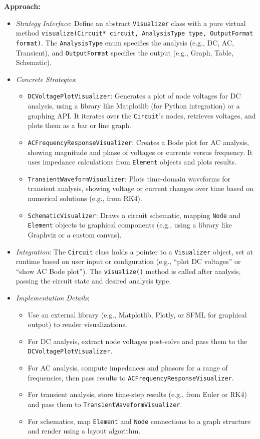 \documentclass{article}
\begin{document}
\textbf{Approach:}
\begin{itemize}
    \item \textit{Strategy Interface}: Define an abstract \texttt{Visualizer} class with a pure virtual method \texttt{visualize(Circuit* circuit, AnalysisType type, OutputFormat format)}. The \texttt{AnalysisType} enum specifies the analysis (e.g., DC, AC, Transient), and \texttt{OutputFormat} specifies the output (e.g., Graph, Table, Schematic).
    \item \textit{Concrete Strategies}:
    \begin{itemize}
        \item \texttt{DCVoltagePlotVisualizer}: Generates a plot of node voltages for DC analysis, using a library like Matplotlib (for Python integration) or a graphing API. It iterates over the \texttt{Circuit}’s nodes, retrieves voltages, and plots them as a bar or line graph.
        \item \texttt{ACFrequencyResponseVisualizer}: Creates a Bode plot for AC analysis, showing magnitude and phase of voltages or currents versus frequency. It uses impedance calculations from \texttt{Element} objects and plots results.
        \item \texttt{TransientWaveformVisualizer}: Plots time-domain waveforms for transient analysis, showing voltage or current changes over time based on numerical solutions (e.g., from RK4).
        \item \texttt{SchematicVisualizer}: Draws a circuit schematic, mapping \texttt{Node} and \texttt{Element} objects to graphical components (e.g., using a library like Graphviz or a custom canvas).
    \end{itemize}
    \item \textit{Integration}: The \texttt{Circuit} class holds a pointer to a \texttt{Visualizer} object, set at runtime based on user input or configuration (e.g., “plot DC voltages” or “show AC Bode plot”). The \texttt{visualize()} method is called after analysis, passing the circuit state and desired analysis type.
    \item \textit{Implementation Details}:
    \begin{itemize}
        \item Use an external library (e.g., Matplotlib, Plotly, or SFML for graphical output) to render visualizations.
        \item For DC analysis, extract node voltages post-solve and pass them to the \texttt{DCVoltagePlotVisualizer}.
        \item For AC analysis, compute impedances and phasors for a range of frequencies, then pass results to \texttt{ACFrequencyResponseVisualizer}.
        \item For transient analysis, store time-step results (e.g., from Euler or RK4) and pass them to \texttt{TransientWaveformVisualizer}.
        \item For schematics, map \texttt{Element} and \texttt{Node} connections to a graph structure and render using a layout algorithm.
    \end{itemize}
\end{itemize}
\end{document}
